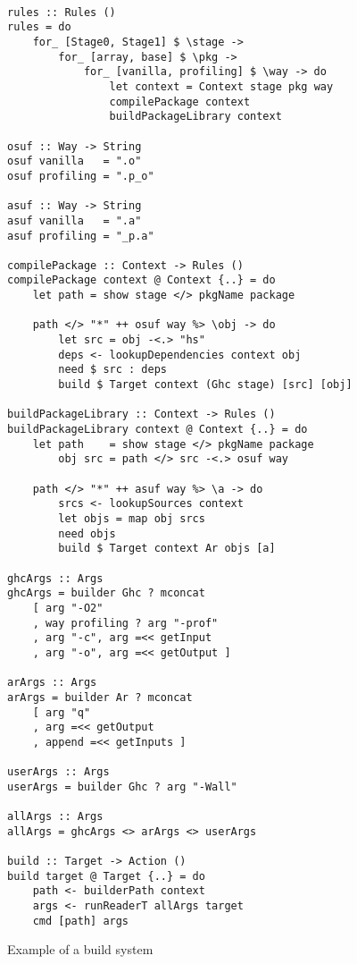\begin{figure}
\begin{lstlisting}[basicstyle=\ttfamily]

rules :: Rules ()
rules = do
    for_ [Stage0, Stage1] $ \stage ->
        for_ [array, base] $ \pkg ->
            for_ [vanilla, profiling] $ \way -> do
                let context = Context stage pkg way
                compilePackage context
                buildPackageLibrary context

osuf :: Way -> String
osuf vanilla   = ".o"
osuf profiling = ".p_o"

asuf :: Way -> String
asuf vanilla   = ".a"
asuf profiling = "_p.a"

compilePackage :: Context -> Rules ()
compilePackage context @ Context {..} = do
    let path = show stage </> pkgName package

    path </> "*" ++ osuf way %> \obj -> do
        let src = obj -<.> "hs"
        deps <- lookupDependencies context obj
        need $ src : deps
        build $ Target context (Ghc stage) [src] [obj]

buildPackageLibrary :: Context -> Rules ()
buildPackageLibrary context @ Context {..} = do
    let path    = show stage </> pkgName package
        obj src = path </> src -<.> osuf way

    path </> "*" ++ asuf way %> \a -> do
        srcs <- lookupSources context
        let objs = map obj srcs
        need objs
        build $ Target context Ar objs [a]
                
ghcArgs :: Args
ghcArgs = builder Ghc ? mconcat
    [ arg "-O2"
    , way profiling ? arg "-prof"
    , arg "-c", arg =<< getInput
    , arg "-o", arg =<< getOutput ]
    
arArgs :: Args
arArgs = builder Ar ? mconcat
    [ arg "q"
    , arg =<< getOutput
    , append =<< getInputs ]

userArgs :: Args
userArgs = builder Ghc ? arg "-Wall"

allArgs :: Args
allArgs = ghcArgs <> arArgs <> userArgs

build :: Target -> Action ()
build target @ Target {..} = do
    path <- builderPath context
    args <- runReaderT allArgs target
    cmd [path] args
\end{lstlisting}
\caption{Example of a build system\label{fig:example-abstractions}}
\end{figure}
